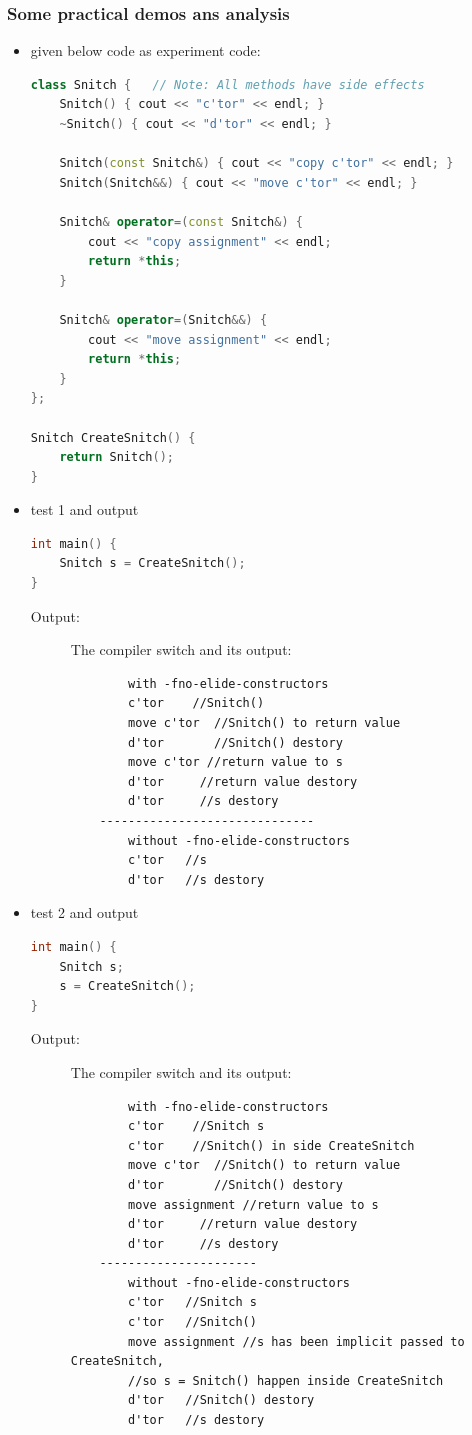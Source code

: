 \documentclass[a4paper,11pt,twoside]{book}
\begin{document}
\subsubsection{Some practical demos ans analysis}
\begin{itemize}
	
	\item given below code as experiment code:
\begin{lstlisting}[frame=single, language=c++]
class Snitch {   // Note: All methods have side effects
	Snitch() { cout << "c'tor" << endl; }
	~Snitch() { cout << "d'tor" << endl; }
	
	Snitch(const Snitch&) { cout << "copy c'tor" << endl; }
	Snitch(Snitch&&) { cout << "move c'tor" << endl; }
	
	Snitch& operator=(const Snitch&) {
		cout << "copy assignment" << endl;
		return *this;
	}
	
	Snitch& operator=(Snitch&&) {
		cout << "move assignment" << endl;
		return *this;
	}
};
	
Snitch CreateSnitch() {
	return Snitch();
}
	\end{lstlisting}
	
	\item test 1 and output 
\begin{lstlisting}[frame=single, language=c++]
int main() {
	Snitch s = CreateSnitch();
}
\end{lstlisting}
\begin{description}
	\item[Output:] The compiler switch and its output:
	\begin{verbatim}
		with -fno-elide-constructors
		c'tor    //Snitch()
		move c'tor  //Snitch() to return value
		d'tor       //Snitch() destory
		move c'tor //return value to s
		d'tor     //return value destory
		d'tor     //s destory
	------------------------------
		without -fno-elide-constructors
		c'tor   //s
		d'tor   //s destory
	\end{verbatim}
\end{description}
	
	\item test 2 and output
	\begin{lstlisting}[frame=single, language=c++]
int main() {
	Snitch s;
	s = CreateSnitch();
}
	\end{lstlisting}
\begin{description}
	\item[Output:] The compiler switch and its output:
	\begin{verbatim}
		with -fno-elide-constructors
		c'tor    //Snitch s
		c'tor    //Snitch() in side CreateSnitch
		move c'tor  //Snitch() to return value
		d'tor       //Snitch() destory
		move assignment //return value to s
		d'tor     //return value destory
		d'tor     //s destory
	----------------------	
		without -fno-elide-constructors
		c'tor   //Snitch s
		c'tor   //Snitch()
		move assignment //s has been implicit passed to CreateSnitch, 
		//so s = Snitch() happen inside CreateSnitch
		d'tor   //Snitch() destory
		d'tor   //s destory
	\end{verbatim}
\end{description}


\end{itemize}
\end{document}
